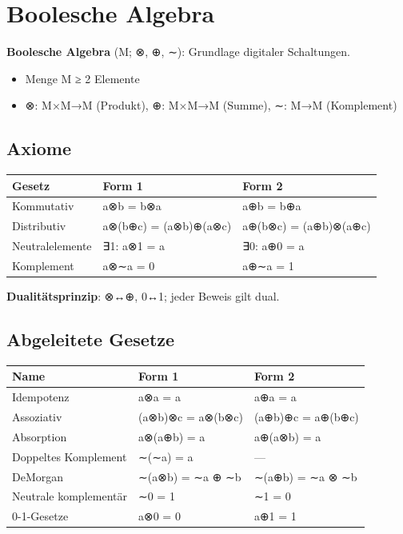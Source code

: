 \documentclass[11pt, a4paper]{article}
\begin{document}
\section{Boolesche Algebra}

\textbf{Boolesche Algebra} (M; ⊗, ⊕, ∼): Grundlage digitaler Schaltungen.

\begin{itemize}
  \item Menge M ≥ 2 Elemente
  \item ⊗: M×M→M (Produkt), ⊕: M×M→M (Summe), ∼: M→M (Komplement)
\end{itemize}


\subsection{Axiome}


{\small
\begin{tabularx}{\linewidth}{XXX}
\hline
\rowcolor{tableheadbg}
{\color{white}\textbf{Gesetz}} & {\color{white}\textbf{Form 1}} & {\color{white}\textbf{Form 2}} \\[2pt]
\hline
\endhead
\hline
\endfoot
Kommutativ & a⊗b = b⊗a & a⊕b = b⊕a \\
Distributiv & a⊗(b⊕c) = (a⊗b)⊕(a⊗c) & a⊕(b⊗c) = (a⊕b)⊗(a⊕c) \\
Neutralelemente & ∃1: a⊗1 = a & ∃0: a⊕0 = a \\
Komplement & a⊗∼a = 0 & a⊕∼a = 1 \\
\end{tabularx}
}


\textbf{Dualitätsprinzip}: ⊗↔⊕, 0↔1; jeder Beweis gilt dual.



\subsection{Abgeleitete Gesetze}


{\small
\begin{tabularx}{\linewidth}{XXX}
\hline
\rowcolor{tableheadbg}
{\color{white}\textbf{Name}} & {\color{white}\textbf{Form 1}} & {\color{white}\textbf{Form 2}} \\[2pt]
\hline
\endhead
\hline
\endfoot
Idempotenz & a⊗a = a & a⊕a = a \\
Assoziativ & (a⊗b)⊗c = a⊗(b⊗c) & (a⊕b)⊕c = a⊕(b⊕c) \\
Absorption & a⊗(a⊕b) = a & a⊕(a⊗b) = a \\
Doppeltes Komplement & ∼(∼a) = a & — \\
DeMorgan & ∼(a⊗b) = ∼a ⊕ ∼b & ∼(a⊕b) = ∼a ⊗ ∼b \\
Neutrale komplementär & ∼0 = 1 & ∼1 = 0 \\
0-1-Gesetze & a⊗0 = 0 & a⊕1 = 1 \\
\end{tabularx}
}
\end{document}
